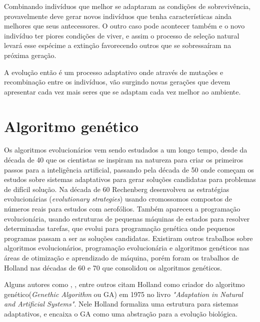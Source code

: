 Combinando indivíduos que melhor se adaptaram as condições de sobrevivência, provavelmente deve gerar novos indivíduos que tenha características ainda melhores que seus antecessores. O outro caso pode acontecer também e o novo indivíduo ter piores condições de viver, e assim o processo de seleção natural levará esse espécime a extinção favorecendo outros que se sobressaíram na próxima geração.

A evolução então é um processo adaptativo onde através de mutações e recombinação entre os indivíduos, vão surgindo novas gerações que devem apresentar cada vez mais seres que se adaptam cada vez melhor ao ambiente.

\section{Algoritmo genético}

Os algoritmos evolucionários vem sendo estudados a um longo tempo, desde da década de 40 que os cientistas se inspiram na natureza para criar os primeiros passos para a inteligência artificial, passando pela década de 50 onde começam os estudos sobre sistemas adaptativos para gerar soluções candidatas para problemas de difícil solução. Na década de 60 Rechenberg desenvolveu as estratégias evolucionárias (\textit{evolutionary strategies}) usando cromossomos compostos de números reais para estudos com aerofólios. Também apareceu a programação evolucionária, usando estruturas de pequenas máquinas de estados para resolver determinadas tarefas, que evolui para programação genética onde pequenos programas passam a ser as soluções candidatas. Existiram outros trabalhos sobre algoritmos evolucionários, programação evolucionária e algoritmos genéticos nas áreas de otimização e aprendizado de máquina, porém foram os trabalhos de Holland nas décadas de 60 e 70 que consolidou os algoritmos genéticos. \cite{Mitchell1996, Linden2008}

Alguns autores como \citeauthor{Mitchell1996}, \citeauthor{LeeJacobson2015}, \citeauthor{Kwong2001} entre outros citam Holland como criador do algoritmo genético(\textit{Genethic Algorithm} ou GA) em 1975 no livro \textit{"Adaptation in Natural and Artificial Systems"}. Nele Holland formaliza uma estrutura para sistemas adaptativos, e encaixa o GA como uma abstração para a evolução biológica.


